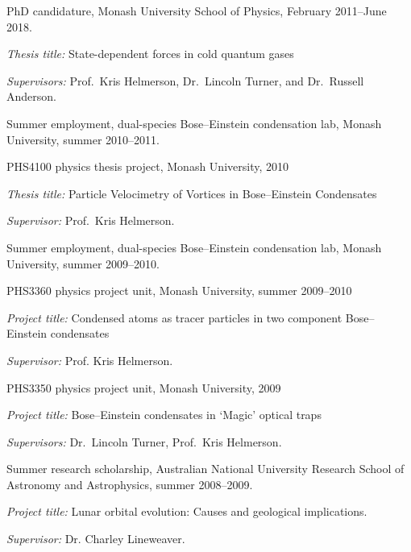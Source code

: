 \documentclass[10pt,letterpaper]{article}
\renewenvironment{itemize}{
  \begin{list}{}{
    \setlength{\leftmargin}{1.5em}
    \setlength{\itemsep}{0.25em}
    \setlength{\parskip}{0pt}
    \setlength{\parsep}{0.25em}
  }
}{
  \end{list}
}
\begin{document}
\begin{itemize}
\item{PhD candidature, Monash University School of Physics, February 2011--June 2018.}
    \begin{itemize}
      \item \textit{Thesis title:}
      State-dependent forces in cold quantum gases
      \item\textit{Supervisors:}
      Prof.~Kris Helmerson, Dr.~Lincoln Turner, and Dr.~Russell Anderson.
    \end{itemize}
\item Summer employment, dual-species Bose--Einstein condensation lab, Monash University, summer 2010--2011.
\item PHS4100 physics thesis project, Monash University, 2010
    \begin{itemize}
      \item \textit{Thesis title:}
      Particle Velocimetry of Vortices in Bose--Einstein Condensates
      \item\textit{Supervisor:}
      Prof.~Kris Helmerson.
    \end{itemize}
\item Summer employment, dual-species Bose--Einstein condensation lab, Monash University, summer 2009--2010.
\item PHS3360 physics project unit, Monash University, summer 2009--2010
    \begin{itemize}
      \item \textit{Project title:}
      Condensed atoms as tracer particles in two component Bose--Einstein condensates
      \item\textit{Supervisor:}
      Prof. Kris Helmerson.
    \end{itemize}
\item PHS3350 physics project unit, Monash University, 2009
    \begin{itemize}
      \item \textit{Project title:}
      Bose--Einstein condensates in `Magic' optical traps
      \item\textit{Supervisors:}
      Dr.~Lincoln Turner, Prof.~Kris Helmerson.
    \end{itemize}    
\item Summer research scholarship, Australian National University Research School of Astronomy and Astrophysics, summer 2008--2009.
    \begin{itemize}
      \item \textit{Project title:}
      Lunar orbital evolution: Causes and geological implications.
      \item\textit{Supervisor:}
      Dr. Charley Lineweaver.
    \end{itemize}

\end{itemize}
\end{document}
